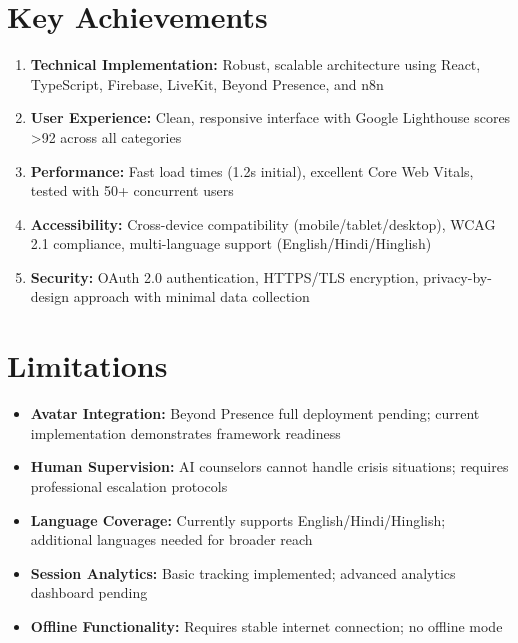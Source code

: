 \documentclass[11pt,a4paper]{report}
\begin{document}
\section{Key Achievements}
\begin{enumerate}
    \item \textbf{Technical Implementation:} Robust, scalable architecture using React, TypeScript, Firebase, LiveKit, Beyond Presence, and n8n
    \item \textbf{User Experience:} Clean, responsive interface with Google Lighthouse scores >92 across all categories
    \item \textbf{Performance:} Fast load times (1.2s initial), excellent Core Web Vitals, tested with 50+ concurrent users
    \item \textbf{Accessibility:} Cross-device compatibility (mobile/tablet/desktop), WCAG 2.1 compliance, multi-language support (English/Hindi/Hinglish)
    \item \textbf{Security:} OAuth 2.0 authentication, HTTPS/TLS encryption, privacy-by-design approach with minimal data collection
\end{enumerate}

\section{Limitations}
\begin{itemize}
    \item \textbf{Avatar Integration:} Beyond Presence full deployment pending; current implementation demonstrates framework readiness
    \item \textbf{Human Supervision:} AI counselors cannot handle crisis situations; requires professional escalation protocols
    \item \textbf{Language Coverage:} Currently supports English/Hindi/Hinglish; additional languages needed for broader reach
    \item \textbf{Session Analytics:} Basic tracking implemented; advanced analytics dashboard pending
    \item \textbf{Offline Functionality:} Requires stable internet connection; no offline mode
\end{itemize}
\end{document}
